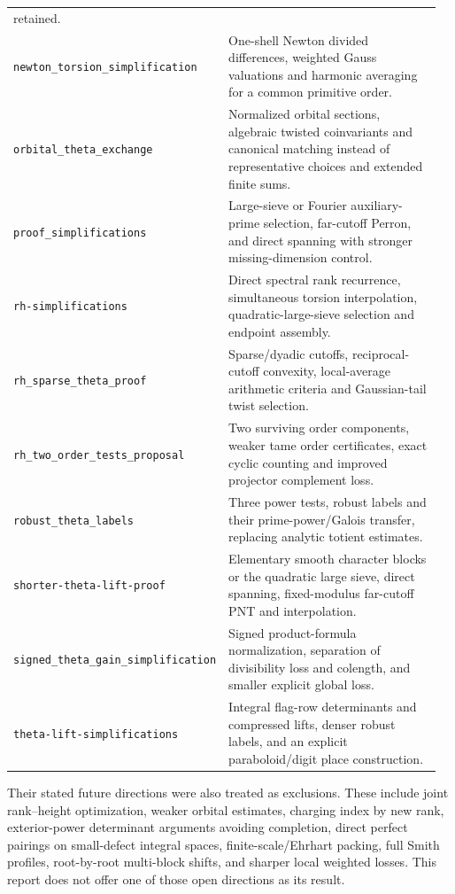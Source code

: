 \documentclass[11pt,letterpaper]{article}
\theoremstyle{remark}
\newcommand{\code}[1]{{\small\nolinkurl{#1}}}
\begin{document}
\begin{longtable}{@{}p{0.36\linewidth}p{0.60\linewidth}@{}}
retained.\\[5pt]
\code{newton_torsion_simplification} & One-shell Newton divided differences,
weighted Gauss valuations and harmonic averaging for a common primitive order.\\[5pt]
\code{orbital_theta_exchange} & Normalized orbital sections, algebraic twisted
coinvariants and canonical matching instead of representative choices and
extended finite sums.\\[5pt]
\code{proof_simplifications} & Large-sieve or Fourier auxiliary-prime selection,
far-cutoff Perron, and direct spanning with stronger missing-dimension control.\\[5pt]
\code{rh-simplifications} & Direct spectral rank recurrence, simultaneous torsion
interpolation, quadratic-large-sieve selection and endpoint assembly.\\[5pt]
\code{rh_sparse_theta_proof} & Sparse/dyadic cutoffs, reciprocal-cutoff convexity,
local-average arithmetic criteria and Gaussian-tail twist selection.\\[5pt]
\code{rh_two_order_tests_proposal} & Two surviving order components, weaker tame
order certificates, exact cyclic counting and improved projector complement loss.\\[5pt]
\code{robust_theta_labels} & Three power tests, robust labels and their
prime-power/Galois transfer, replacing analytic totient estimates.\\[5pt]
\code{shorter-theta-lift-proof} & Elementary smooth character blocks or the
quadratic large sieve, direct spanning, fixed-modulus far-cutoff PNT and interpolation.\\[5pt]
\code{signed_theta_gain_simplification} & Signed product-formula normalization,
separation of divisibility loss and colength, and smaller explicit global loss.\\[5pt]
\code{theta-lift-simplifications} & Integral flag-row determinants and compressed
lifts, denser robust labels, and an explicit paraboloid/digit place construction.\\
\end{longtable}
\normalsize

Their stated future directions were also treated as exclusions. These include
joint rank--height optimization, weaker orbital estimates, charging index by new
rank, exterior-power determinant arguments avoiding completion, direct perfect
pairings on small-defect integral spaces, finite-scale/Ehrhart packing, full
Smith profiles, root-by-root multi-block shifts, and sharper local weighted
losses. This report does not offer one of those open directions as its result.
\end{document}
